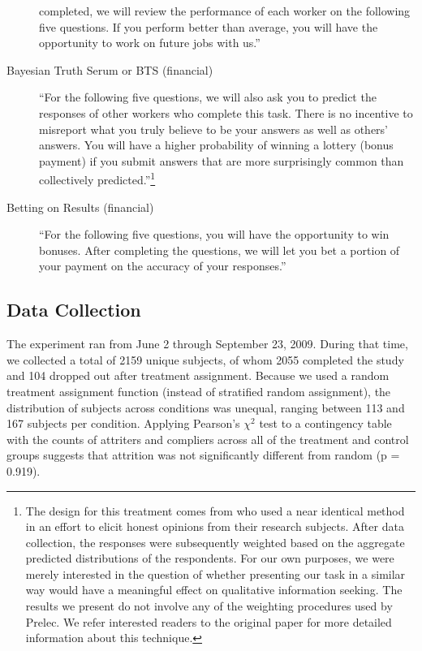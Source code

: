 \documentclass{cscw2010}
\begin{document}
\begin{description}
  completed, we will review the performance of each worker on the
  following five questions. If you perform better than average, you
  will have the opportunity to work on future jobs with us.''
\item[Bayesian Truth Serum or BTS (financial)] ``For the following
  five questions, we will also ask you to predict the responses of
  other workers who complete this task. There is no incentive to
  misreport what you truly believe to be your answers as well as
  others' answers. You will have a higher probability of winning a
  lottery (bonus payment) if you submit answers that are more
  surprisingly common than collectively predicted.''\footnote{The
    design for this treatment comes from \cite{prelec_bts_2004} who
    used a near identical method in an effort to elicit honest
    opinions from their research subjects. After data collection, the
    responses were subsequently weighted based on the aggregate
    predicted distributions of the respondents. For our own purposes,
    we were merely interested in the question of whether presenting
    our task in a similar way would have a meaningful effect on
    qualitative information seeking. The results we present do not
    involve any of the weighting procedures used by Prelec. We refer
    interested readers to the original paper for more detailed
    information about this technique.}
\item[Betting on Results (financial)] ``For the following five
  questions, you will have the opportunity to win bonuses. After
  completing the questions, we will let you bet a portion of your
  payment on the accuracy of your responses.''
\end{description} 

\subsection{Data Collection}
The experiment ran from June 2 through September 23, 2009. During that
time, we collected a total of 2159 unique subjects, of whom 2055
completed the study and 104 dropped out after treatment
assignment. Because we used a random treatment assignment function
(instead of stratified random assignment), the distribution of
subjects across conditions was unequal, ranging between 113 and 167
subjects per condition. Applying Pearson's $\chi^{2}$ test to a
contingency table with the counts of attriters and compliers across
all of the treatment and control groups suggests that attrition was
not significantly different from random (p = 0.919).
\end{document}
